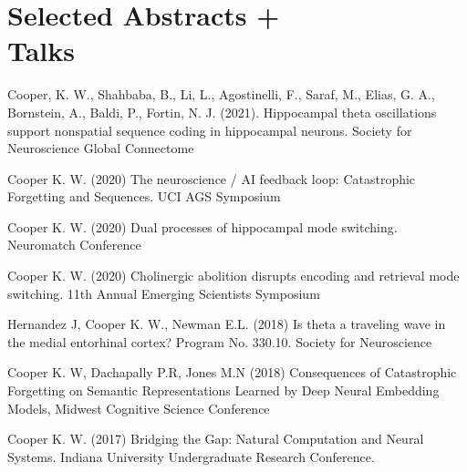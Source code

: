 \documentclass[10pt]{cooperCV2}
\begin{document}
\section{Selected Abstracts +  \\Talks}

\begin{etaremune}[itemindent=-\bibhang, topsep=0pt,
				   itemsep=\bibsep,partopsep=0pt,parsep=0pt,leftmargin={\bibhang+\widthof{[999]}}] 
    \item  Cooper, K. W., Shahbaba, B., Li, L., Agostinelli, F., Saraf, M., Elias, G. A., Bornstein, A., Baldi, P.,  Fortin, N. J. (2021). Hippocampal theta oscillations support nonspatial sequence coding in hippocampal neurons. Society for Neuroscience Global Connectome


    \item  Cooper K. W. (2020) The neuroscience / AI feedback loop: Catastrophic Forgetting and Sequences. UCI AGS Symposium


    \item Cooper K. W. (2020) Dual processes of hippocampal mode switching. Neuromatch Conference

    \item Cooper K. W. (2020) Cholinergic abolition disrupts encoding and retrieval mode switching. 11th Annual Emerging Scientists Symposium

    \item Hernandez J, Cooper K. W., Newman E.L. (2018) Is theta a traveling wave in the medial entorhinal cortex? Program No. 330.10. Society for Neuroscience

    \item Cooper K. W, Dachapally P.R, Jones M.N (2018) Consequences of Catastrophic Forgetting on Semantic Representations Learned by Deep Neural Embedding Models, Midwest Cognitive Science Conference

    \item Cooper K. W. (2017) Bridging the Gap: Natural Computation and Neural Systems. Indiana University Undergraduate Research Conference.

\end{etaremune}
\end{document}
